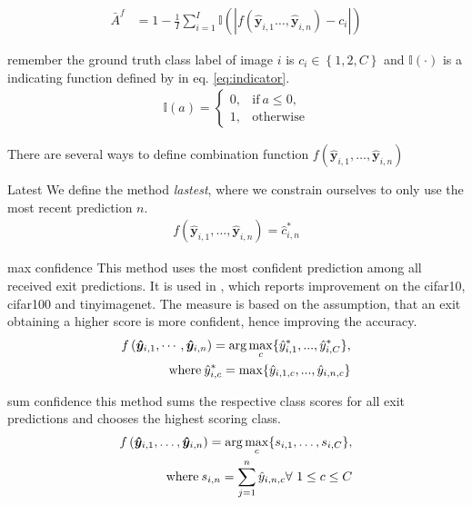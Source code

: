 \begin{enumdescript}
		\begin{align}
		\bar{A}^f &= 1 - \frac{1}{I} \sum_{i=1}^{I}\mathbb{I}\left(\left|f\left(\bm{\hat{y}}_{i,1} \dots, \bm{\hat{y}}_{i,n}\right)-c_i\right|\right)
		\end{align}
		
		remember the ground truth class label of image $ i $ is $ c_i \in \left\{1, 2, C \right\} $ and $ \mathbb{I(\cdot)}  $ is a indicating function defined by in eq. \ref{eq:indicator}.
		\begin{align*}
		\mathbb{I}(a)= \begin{cases}
		0, & \mathrm{if\:} a \leq 0, \\
		1, & \mathrm{otherwise}
		\end{cases}
		\end{align*}
		
		There are several ways to define combination function $ f\left(\bm{\hat{y}}_{i,1}, \dots, \bm{\hat{y}}_{i,n}\right) $
		\begin{enumdescript}
			
			
			\item[Latest] We define the method \emph{lastest}, where we constrain ourselves to only use the most recent prediction $n$.
			\begin{align}
			f\left(\bm{\hat{y}}_{i,1}, \dots, \bm{\hat{y}}_{i,n} \right) = \hat{c}_{i,n}^{*}
			\end{align}
			
			\item[max confidence] This method uses the most confident prediction among all received exit predictions. It is used in \cite{kaya_shallow-deep_nodate}, which reports improvement on the \gls{cifar10}, \gls{cifar100} and \gls{tinyimagenet}. The measure is based on the assumption, that an exit obtaining a higher score is more confident, hence improving the accuracy.
			\begin{align}
			\begin{split}
			f\left(\bm{\hat{y}}_{i,1}, \cdots, \bm{\hat{y}}_{i,n} \right) =  \arg \underset{c}{\max} \{\hat{y}^*_{i,1}, ..., \hat{y}^*_{i,C} \},
			\\ \text{where\:} \hat{y}^*_{i,c} = \max \{\hat{y}_{i,1,c}, ..., \hat{y}_{i,n,c}\}
			\end{split}	
			\end{align}
			\item[sum confidence] this method sums the respective class scores for all exit predictions and chooses the highest scoring class. 
			\begin{align}
			\begin{split}
			f\left(\bm{\hat{y}}_{i,1}, \dots, \bm{\hat{y}}_{i,n} \right) = \arg \underset{c}{\max} \{s_{i,1}, \dots, s_{i,C}\}, \\ \text{where\:} s_{i,n} = \sum_{j=1}^{n}\hat{y}_{i,n,c} \forall \ 1\le c \le C
			\end{split}
			\end{align}
			

\end{enumdescript}
\end{enumdescript}
